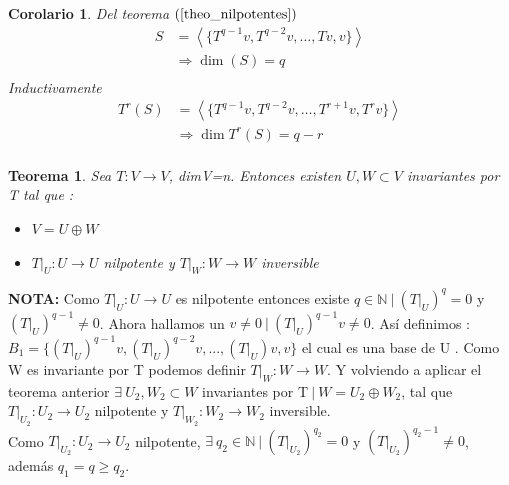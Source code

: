 \documentclass[12pt,a4paper]{article}
\newtheorem{mytheo}{Teorema}[section]
\newtheorem{mycorol}{Corolario}[section]
\begin{document}
\begin{multicols}{2}
\begin{mycorol}
	Del teorema $(\ref{theo_nilpotentes})$
	\begin{align*}
		S &= \left<\{T^{q-1}v, T^{q-2}v,\ldots,Tv, v\}\right>\\
		&\Rightarrow\dim (S) = q\\			
	\end{align*}
    Inductivamente 
	\begin{align*}
		T^{r}(S) &= \left<\{T^{q-1}v, T^{q-2}v,\ldots,T^{r+1}v, T^{r}v\}\right>\\
		&\Rightarrow\dim T^{r}(S) = q-r\\			
	\end{align*}
\end{mycorol}
\begin{mytheo}
\noindent Sea $T:V\rightarrow V$, dimV=n. Entonces existen $U, W \subset V$ invariantes por T tal que :
\begin{itemize}
    \item $V=U\oplus W$ 
    \item $T|_{U}:U\rightarrow U$ nilpotente  y $T|_{W}:W\rightarrow W$ inversible
\end{itemize}
\end{mytheo}
\noindent\textbf{NOTA:}
\noindent Como $T|_{U}:U\rightarrow U$ es nilpotente entonces existe $q\in\mathbb{N} \ | \  \left(T|_{U}\right)^{q}=0 $ y $(T|_{U})^{q-1}\neq 0$. Ahora hallamos un $v\neq0 \ | \ (T|_{U})^{q-1}v\neq 0$. Así definimos :\\
$B_{1}=\{(T|_{U})^{q-1}v, (T|_{U})^{q-2}v, ..., (T|_{U})v,v \}$ el cual es una base de U . Como W es invariante por T podemos definir $T|_{W}:W\rightarrow W$. Y volviendo a aplicar el teorema anterior $\exists \ U_{2}, W_{2} \subset W$ invariantes por T$\ | \  W=U_{2}\oplus W_{2}$, tal que \\
$T|_{U_{2}}: U_{2}\rightarrow U_{2}$ nilpotente y $T|_{W_{2}}:W_{2}\rightarrow W_{2}$ inversible.\\
Como $T|_{U_{2}}:U_{2}\rightarrow U_{2}$ nilpotente, $\exists \ q_{2} \in \mathbb{N} \ | \ (T|_{U_{2}})^{q_{2}}=0$ y $(T|_{U_{2}})^{q_{2}-1}\neq 0$, además  $q_{1}=q\geq q_{2}.$

\end{multicols}
\end{document}
